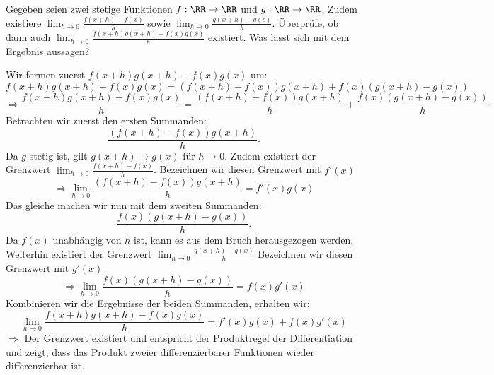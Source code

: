 Gegeben seien zwei stetige Funktionen $f:\RR\to\RR$ und $g:\RR\to\RR$. Zudem existiere $\lim_{h\to0}\frac{f(x+h)-f(x)}{h}$ sowie $\lim_{h\to0}\frac{g(x+h)-g(c)}{h}$. Überprüfe, ob dann auch $\lim_{h\to0}\frac{f(x+h)g(x+h)-f(x)g(x)}{h}$ existiert. Was lässt sich mit dem Ergebnis aussagen?

\begin{solution}
        
    Wir formen zuerst $f(x+h)g(x+h) - f(x)g(x)$ um:    
    \[
    f(x+h)g(x+h)-f(x)g(x) 
    = (f(x+h)-f(x))g(x+h)+f(x)(g(x+h)-g(x))
    \]
    \[
    \Rightarrow \frac{f(x+h)g(x+h)-f(x)g(x)}{h}
    =\frac{(f(x+h)-f(x))g(x+h)}{h}+\frac{f(x)(g(x+h)-g(x))}{h}
    \]
    Betrachten wir zuerst den ersten Summanden:
    \[
    \frac{(f(x+h) - f(x))g(x+h)}{h}.
    \]
    Da $g$ stetig ist, gilt $g(x+h) \to g(x)$ für $h \to 0$. Zudem existiert der Grenzwert $\lim_{h \to 0} \frac{f(x+h) - f(x)}{h}$.    
    Bezeichnen wir diesen Grenzwert mit $f'(x)$    
    \[
    \Rightarrow \lim_{h \to 0} \frac{(f(x+h) - f(x))g(x+h)}{h} = f'(x)g(x)
    \]
    Das gleiche machen wir nun mit dem zweiten Summanden:
    \[
    \frac{f(x)(g(x+h) - g(x))}{h}.
    \]
    Da $f(x)$ unabhängig von $h$ ist, kann es aus dem Bruch herausgezogen werden. Weiterhin existiert der Grenzwert $\lim_{h\to0}\frac{g(x+h)-g(x)}{h}$
    Bezeichnen wir diesen Grenzwert mit $g'(x)$
    \[
    \Rightarrow \lim_{h\to0}\frac{f(x)(g(x+h)-g(x))}{h}
    =f(x)g'(x)
    \]
    Kombinieren wir die Ergebnisse der beiden Summanden, erhalten wir:
    \[
    \lim_{h\to0}\frac{f(x+h)g(x+h)-f(x)g(x)}{h}
    =f'(x)g(x)+f(x)g'(x)
    \]
    $\Rightarrow$ Der Grenzwert existiert und entspricht der Produktregel der Differentiation und zeigt, dass das Produkt zweier differenzierbarer Funktionen wieder differenzierbar ist.
\end{solution}